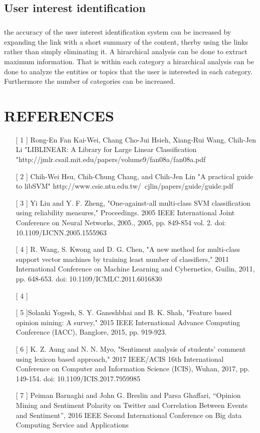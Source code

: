 \section{User interest identification}
	\paragraph{} the accuracy of the user interest identification system can be increased by expanding the link with a short summary of the content, therby using the links rather than simply eliminating it. A hirarchical analysis can be done to extract maximum information. That is within each category a hirarchical analysis can be done to analyze the entities or topics that the user is interested in each category. Furthermore the number of categories can be increased.
	
\chapter{REFERENCES}
\begin{enumerate}
\item[[ 1]]{ Rong-En Fan Kai-Wei, Chang Cho-Jui Hsieh, Xiang-Rui Wang, Chih-Jen Li "LIBLINEAR: A Library for Large Linear Classification "http://jmlr.csail.mit.edu/papers/volume9/fan08a/fan08a.pdf}

\item[[ 2]]{  Chih-Wei Hsu, Chih-Chung Chang, and Chih-Jen Lin "A practical guide to libSVM" http://www.csie.ntu.edu.tw/~cjlin/papers/guide/guide.pdf}

\item[[ 3]]{ Yi Liu and Y. F. Zheng, "One-against-all multi-class SVM classification using reliability measures," Proceedings. 2005 IEEE International Joint Conference on Neural Networks, 2005., 2005, pp. 849-854 vol. 2.
doi: 10.1109/IJCNN.2005.1555963}

\item[[ 4]]{ R. Wang, S. Kwong and D. G. Chen, "A new method for multi-class support vector machines by training least number of classifiers," 2011 International Conference on Machine Learning and Cybernetics, Guilin, 2011, pp. 648-653.
doi: 10.1109/ICMLC.2011.6016830}

\item[[ 4]]{ }

\item[[ 5]]{Solanki Yogesh,	S. Y. Ganeshbhai and B. K. Shah, "Feature based opinion mining: A survey," 2015 IEEE International Advance Computing Conference (IACC), Banglore, 2015, pp. 919-923.	
}
\item[[ 6]] { K. Z. Aung and N. N. Myo, "Sentiment analysis of students' comment using lexicon based approach," 2017 IEEE/ACIS 16th International Conference on Computer and Information Science (ICIS), Wuhan, 2017, pp. 149-154.
	doi: 10.1109/ICIS.2017.7959985}

\item[[ 7]] {Peiman Barnaghi and John G. Breslin and Parsa Ghaffari, “Opinion Mining and Sentiment Polarity on Twitter and Correlation Between Events and Sentiment”, 2016 IEEE Second International Conference on Big data Computing Service and Applications
}

\end{enumerate}
